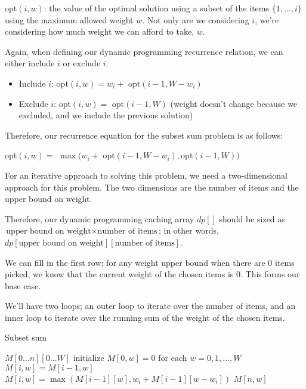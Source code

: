 \documentclass{article}
\begin{document}
{\sc opt}$(i, w)$: the value of the optimal solution using a subset of the items $\{1, \dots, i\}$ using the maximum allowed weight $w$. Not only are we considering $i$, we're considering how much weight we can afford to take, $w$.

Again, when defining our dynamic programming recurrence relation, we can either include $i$ or exclude $i$.

\begin{itemize}
    \item Include $i$: {\sc opt}$(i, w) = w_i +$ {\sc opt}$(i - 1, W - w_i)$
    \item Exclude $i$: {\sc opt}$(i, w) =$ {\sc opt}$(i - 1, W)$ (weight doesn't change because we excluded, and we include the previous solution)
\end{itemize}

Therefore, our recurrence equation for the subset sum problem is as follows:

{\sc opt}$(i, w) =$ $\max(w_i +$ {\sc opt}$(i - 1, W - w_i), ${\sc opt}$(i - 1, W))$

For an iterative approach to solving this problem, we need a two-dimensional approach for this problem. The two dimensions are the number of items and the upper bound on weight.

Therefore, our dynamic programming caching array $dp[]$ should be sized as $\text{upper bound on weight} \times \text{number of items}$; in other words, $dp[\text{upper bound on weight}][\text{number of items}]$.

We can fill in the first row; for any weight upper bound when there are $0$ items picked, we know that the current weight of the chosen items is $0$. This forms our base case.

We'll have two loops; an outer loop to iterate over the number of items, and an inner loop to iterate over the running sum of the weight of the chosen items.

\begin{algorithm}
\caption{Subset sum}\label{subsetSum}
\begin{algorithmic}[1]
\State $M[0 \dots n][0 \dots W]$
\State initialize $M[0, w] = 0$ for each $w = 0, 1, \dots, W$
            \State $M[i, w] = M[i - 1, w]$
        \Else
            \State $M[i, w] = \max(M[i - 1][w], w_i + M[i - 1][w - w_i])$
        \EndIf
    \EndFor
\EndFor
\State \Return $M[n, w]$
\EndProcedure
\end{algorithmic}
\end{algorithm}
\end{document}

